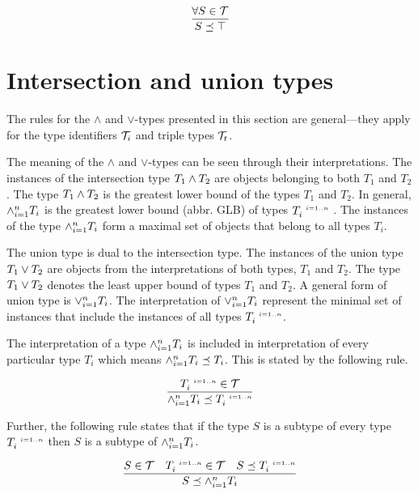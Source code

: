 \documentclass[runningheads]{llncs}
\newcommand{\s}{\scriptscriptstyle\ \,}
\newcommand{\T}{{\cal T}}
\begin{document}
\begin{equation}
\dfrac{\forall\/S\in\T}
      {S\preceq\top}
\end{equation}






\section{Intersection and union types\label{sec:intsc-union}}

The rules for the $\land$ and $\lor$-types presented in this section
are general---they apply for the type identifiers $\T_i$ and triple
types $\T_t$.

The meaning of the $\land$ and $\lor$-types can be seen through their
interpretations. The instances of the intersection type
$T_1\land\/T_2$ are objects belonging to both $T_1$ and $T_2$. The
type $T_1\land\/T_2$ is the greatest lower bound of the types $T_1$
and $T_2$. In general, $\land_{i=1}^n\/T_i$ is the greatest lower
bound (abbr. GLB) of types $T_i^{\s\/i=1..n}$
\cite{Pierce1991,Pierce1996}. The instances of the type
$\land_{i=1}^n\/T_i$ form a maximal set of objects that belong to all
types $T_i$.

The union type is dual to the intersection type. The instances of the
union type $T_1\lor\/T_2$ are objects from the interpretations of both
types, $T_1$ and $T_2$. The type $T_1\lor\/T_2$ denotes the least
upper bound of types $T_1$ and $T_2$. A general form of union type is
$\lor_{i=1}^n\/T_i$. The interpretation of $\lor_{i=1}^n\/T_i$
represent the minimal set of instances that include the instances of
all types $T_i^{\s\/i=1..n}$.

The interpretation of a type $\land_{i=1}^n\/T_i$ is included in
interpretation of every particular type $T_i$ which means
$\land_{i=1}^n\/T_i\preceq\/T_i$. This is stated by the following
rule.

\begin{equation}
\label{rul:land-preceq-elems}
\dfrac{T_i^{\s\/i=1..n}\in\T}
      {\land_{i=1}^n\/T_i\preceq\/T_i^{\s\/i=1..n}} 
\end{equation}

Further, the following rule states that if the type $S$ is a subtype
of every type $T_i^{\s\/i=1..n}$ then $S$ is a subtype of
$\land_{i=1}^n\/T_i$.

\begin{equation}
\label{rul:lbound-preceq-land}
\dfrac{S\in\T\quad\/T_i^{\s\/i=1..n}\in\T\quad\/S\preceq\/T_i^{\s\/i=1..n}}
      {S\preceq\land_{i=1}^n\/T_i}  
\end{equation} 
\end{document}
